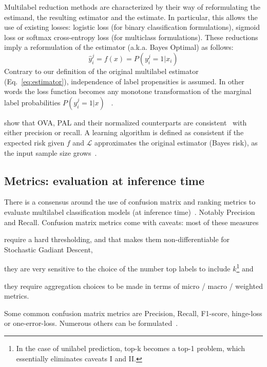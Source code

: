 \vspace{\baselineskip}

Multilabel reduction methods are characterized by their way of reformulating the estimand, the resulting estimator and the estimate. In particular, this allows the use of existing losses: logistic loss (for binary classification formulations), sigmoid loss or softmax cross-entropy loss (for multiclass formulations). These reductions imply a reformulation of the estimator (a.k.a. Bayes Optimal) as follows:
%
\begin{equation}
  \hat{y}_i^j = f(x) = P(y_i^j = 1 | x_i)
\end{equation}
%
Contrary to our definition of the original multilabel estimator (Eq.~\ref{eq:estimator}), independence of label propensities is assumed. In other words the loss function becomes any monotone transformation of the marginal label probabilities $P(y_i^j = 1 | x)$ ~\cite{OVA2, multilabelMetrics, unifiedView}.

\citet{multilabelReduction} show that OVA, PAL and their normalized counterparts are consistent~\citep{consistency-surrogates, consistency-multiclassSVM, consistency-lossAnalysis} with either precision or recall. A learning algorithm is defined as consistent if the expected risk given $f$ and $\mathcal{L}$ approximates the original estimator (Bayes risk), as the input sample size grows~\cite{consistencyMultilabel}.

\subsection{Metrics: evaluation at inference time}
\label{section:background:metrics}

There is a consensus around the use of confusion matrix  and ranking metrics to evaluate multilabel classification models (at inference time)~\cite{multilabelMetrics, weightedMetrics, unifiedView}. Notably Precision and Recall. Confusion matrix metrics come with caveats: most of these measures 
\begin{enumerate*}
\item require a hard thresholding, and that makes them non-differentiable for Stochastic Gadiant Descent, 
\item they are very sensitive to the choice of the number top labels to include $k$\footnote{In the case of unilabel prediction, top-k becomes a top-1 problem, which essentially eliminates caveats I and II.} and 
\item they require aggregation choices to be made in terms of micro / macro / weighted metrics.
\end{enumerate*}
Some common confusion matrix metrics are Precision, Recall, F1-score, hinge-loss or one-error-loss. Numerous others can be formulated~\cite{unifiedView}.



